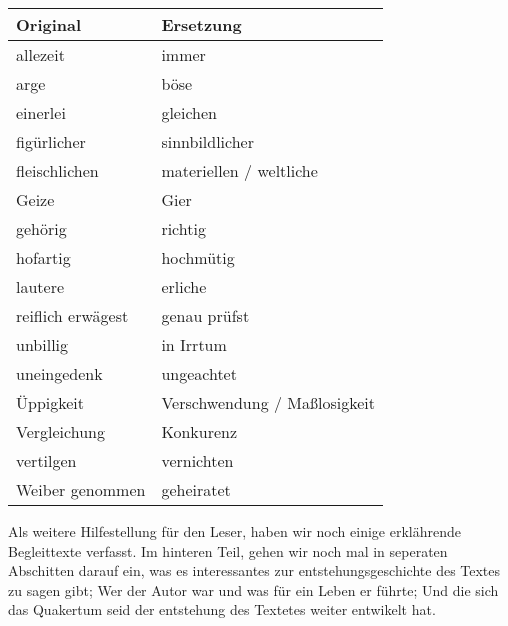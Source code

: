 \medskip

\begin{center}
\label{ref:tab_wortersetzungen}
\begin{tabular}{|l|l|} \hline
\textbf{Original}       & \textbf{Ersetzung}            \\ \hline \hline
allezeit                & immer                         \\ \hline
arge                    & böse                          \\ \hline
einerlei                & gleichen                      \\ \hline
figürlicher             & sinnbildlicher                \\ \hline
fleischlichen           & materiellen / weltliche       \\ \hline
Geize                   & Gier\\ \hline
gehörig                 & richtig                       \\ \hline
hofartig                & hochmütig                     \\ \hline
lautere                 & erliche                       \\ \hline
reiflich erwägest       & genau prüfst                  \\ \hline
unbillig                & in Irrtum                     \\ \hline
uneingedenk             & ungeachtet                    \\ \hline
Üppigkeit               & Verschwendung / Maßlosigkeit          \\ \hline
Vergleichung            & Konkurenz                     \\ \hline
vertilgen               & vernichten                    \\ \hline
Weiber genommen         & geheiratet                    \\ \hline
\end{tabular}
\end{center}
\medskip

\medskip

Als weitere Hilfestellung für den Leser, haben wir noch einige erklährende Begleittexte verfasst. Im hinteren Teil, gehen wir noch mal in seperaten Abschitten darauf ein, was es interessantes zur entstehungsgeschichte des Textes zu sagen gibt; Wer der Autor war und was für ein Leben er führte; Und die sich das Quakertum seid der entstehung des Textetes weiter entwikelt hat.

